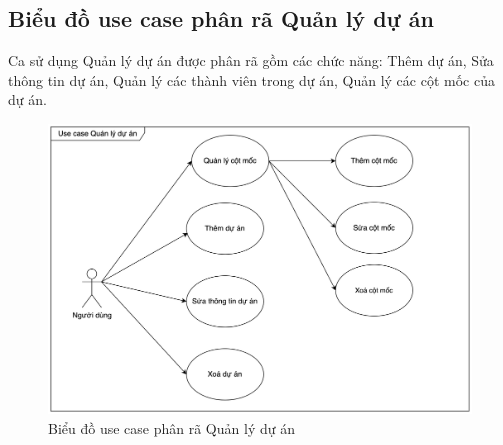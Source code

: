 \documentclass[../DoAn.tex]{subfiles}
\begin{document}
\subsection{Biểu đồ use case phân rã Quản lý dự án}
\label{subsection:2.2.4}
Ca sử dụng Quản lý dự án được phân rã gồm các chức năng: Thêm dự án, Sửa thông tin dự án, Quản lý các thành viên trong dự án,
Quản lý các cột mốc của dự án.
\begin{figure}[H]
    \centering
    \includegraphics[width=1.0\linewidth]{Hinhve/ProjectUseCases.png}
    \caption{Biểu đồ use case phân rã Quản lý dự án}
    \label{fig:ProjectUseCases}
\end{figure}
\newpage

\end{document}

